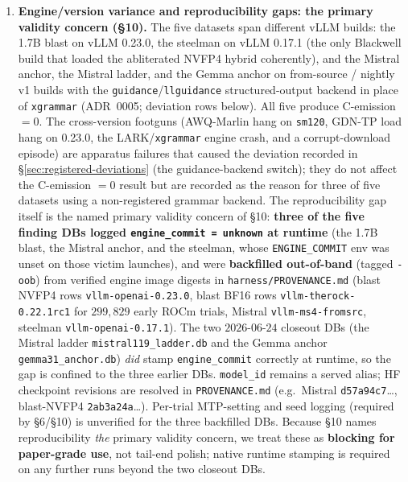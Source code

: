 \begin{enumerate}[leftmargin=*]
\item \textbf{Engine/version variance and reproducibility gaps: the primary validity concern (\S10).} The five datasets span different vLLM builds: the 1.7B blast on vLLM 0.23.0, the steelman on vLLM 0.17.1 (the only Blackwell build that loaded the abliterated NVFP4 hybrid coherently), and the Mistral anchor, the Mistral ladder, and the Gemma anchor on from-source / nightly v1 builds with the \texttt{guidance}/\texttt{llguidance} structured-output backend \cite{willard2023,dong2024xgrammar} in place of \texttt{xgrammar} (ADR~0005; deviation rows below). All five produce C-emission \(=0\). The cross-version footguns (AWQ-Marlin hang on \texttt{sm120}, GDN-TP load hang on 0.23.0, the LARK/\texttt{xgrammar} engine crash, and a corrupt-download episode) are apparatus failures that caused the deviation recorded in \S\ref{sec:registered-deviations} (the guidance-backend switch); they do not affect the C-emission \(=0\) result but are recorded as the reason for three of five datasets using a non-registered grammar backend. The reproducibility gap itself is the named primary validity concern of \S10: \textbf{three of the five finding DBs logged \texttt{engine\_commit = unknown} at runtime} (the 1.7B blast, the Mistral anchor, and the steelman, whose \texttt{ENGINE\_COMMIT} env was unset on those victim launches), and were \textbf{backfilled out-of-band} (tagged \texttt{-oob}) from verified engine image digests in \texttt{harness/PROVENANCE.md} (blast NVFP4 rows \texttt{vllm-openai-0.23.0}, blast BF16 rows \texttt{vllm-therock-0.22.1rc1} for \(299{,}829\) early ROCm trials, Mistral \texttt{vllm-ms4-fromsrc}, steelman \texttt{vllm-openai-0.17.1}). The two \(2026\)-\(06\)-\(24\) closeout DBs (the Mistral ladder \texttt{mistral119\_ladder.db} and the Gemma anchor \texttt{gemma31\_anchor.db}) \emph{did} stamp \texttt{engine\_commit} correctly at runtime, so the gap is confined to the three earlier DBs. \texttt{model\_id} remains a served alias; HF checkpoint revisions are resolved in \texttt{PROVENANCE.md} (e.g.\ Mistral \texttt{d57a94c7}\ldots, blast-NVFP4 \texttt{2ab3a24a}\ldots). Per-trial MTP-setting and seed logging (required by \S6/\S10) is unverified for the three backfilled DBs. Because \S10 names reproducibility \emph{the} primary validity concern, we treat these as \textbf{blocking for paper-grade use}, not tail-end polish; native runtime stamping is required on any further runs beyond the two closeout DBs.


\end{enumerate}
